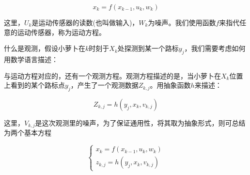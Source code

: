 $$
    x_k = f(x_{k - 1}, u_k, w_k)
$$

    这里，$U_k$是运动传感器的读数(也叫做输入)，$W_k$为噪声。我们使用函数$f$来指代任意的运动传感器，称为运动方程。
    
    什么是观测，假设小萝卜在$k$时刻于$X_k$处探测到某一个路标$y_j$，我们需要考虑如何用数学语言描述：

    与运动方程对应的，还有一个观测方程。观测方程描述的是，当小萝卜在$X_k$位置上看到的某个路标点$y_j$，产生了一个观测数据$Z_{k,j}$。用抽象函数$h$来描述：

$$
    Z_{k, j} = h(y_j, x_k, v_{k, j})
$$

    这里，$V_{k, j}$是这次观测里的噪声，为了保证通用性，将其取为抽象形式，则可总结为两个基本方程

$$
\begin{cases}
	x_k = f(x_{k - 1}, u_k, w_k) \\
	z_{k,j} = h(y_j, x_k, v_{k, j})
\end{cases}
$$

